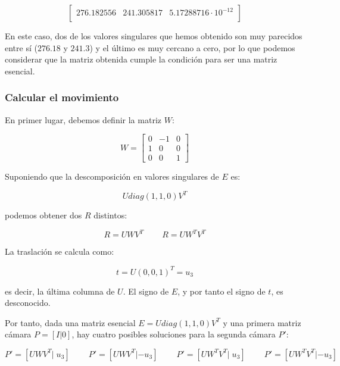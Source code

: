 \documentclass[11pt,a4paper]{article}
\theoremstyle{plain}
\theoremstyle{definition}
\begin{document}
\begin{displaymath}
\left[
\begin{matrix}
276.182556 & 241.305817  & 5.17288716 \cdot 10^{-12}\\
\end{matrix}
\right]
\end{displaymath}

En este caso, dos de los valores singulares que hemos obtenido son muy parecidos entre sí ($276.18$ y $241.3$) y el último es muy cercano a cero, por lo que podemos considerar que la matriz obtenida cumple la condición para ser una matriz esencial.

\subsubsection{Calcular el movimiento}

En primer lugar, debemos definir la matriz $W$:

\begin{displaymath}
W = \left[ \begin{matrix}
0 & -1 & 0 \\
1 & 0 & 0 \\
0 & 0 & 1
\end{matrix} \right] 
\end{displaymath}

Suponiendo que la descomposición en valores singulares de $E$ es:

\begin{displaymath}
U diag(1,1,0) V^T
\end{displaymath}

podemos obtener dos $R$ distintos:

\begin{displaymath}
R = UWV^T \qquad\ R = UW^T V^T
\end{displaymath}

La traslación se calcula como:

\begin{displaymath}
t = U(0,0,1)^T = u_3
\end{displaymath}

es decir, la última columna de $U$. El signo de $E$, y por tanto el signo de $t$, es desconocido.

Por tanto, dada una matriz esencial $E = U diag(1,1,0) V^T$ y una primera matriz cámara $P = [I | 0]$, hay cuatro posibles soluciones para la segunda cámara $P'$:

\begin{displaymath}
P' = [UWV^T | \;u_3] \qquad\ P' = [UWV^T | -u_3] \qquad\ P' = [UW^T V^T |\; u_3] \qquad\ P' = [UW^T V^T | -u_3]
\end{displaymath}
\end{document}
